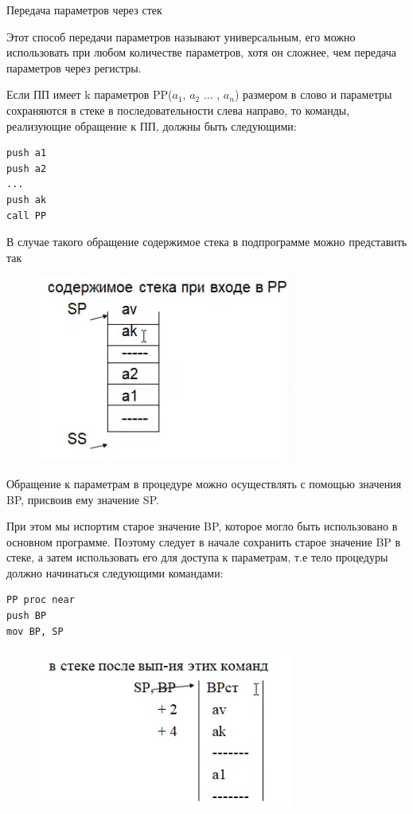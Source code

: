 Передача параметров через стек

Этот способ передачи параметров называют универсальным, его можно использовать при любом количестве параметров, хотя он сложнее, чем передача параметров через регистры.

Если ПП имеет k параметров PP($a_1$, $a_2$ ... , $a_n$) размером в слово и параметры сохраняются в стеке в последовательности слева направо, то команды, реализующие обращение к ПП, должны быть следующими:

\begin{verbatim}
push a1
push a2
...
push ak
call PP
\end{verbatim}

В случае такого обращение содержимое стека в подпрограмме можно представить так

\begin{figure}[H]
\includegraphics{prccstack.png}
\end{figure}

Обращение к параметрам в процедуре можно осуществлять с помощью значения BP, присвоив ему значение SP.

При этом мы испортим старое значение BP, которое могло быть использовано в основном программе. Поэтому следует в начале сохранить старое значение BP в стеке, а затем использовать его для доступа к параметрам, т.е тело процедуры должно начинаться следующими командами:

\begin{verbatim}
PP proc near
push BP
mov BP, SP
\end{verbatim}

\begin{figure}[H]
\includegraphics{procstack2.png}
\end{figure}

